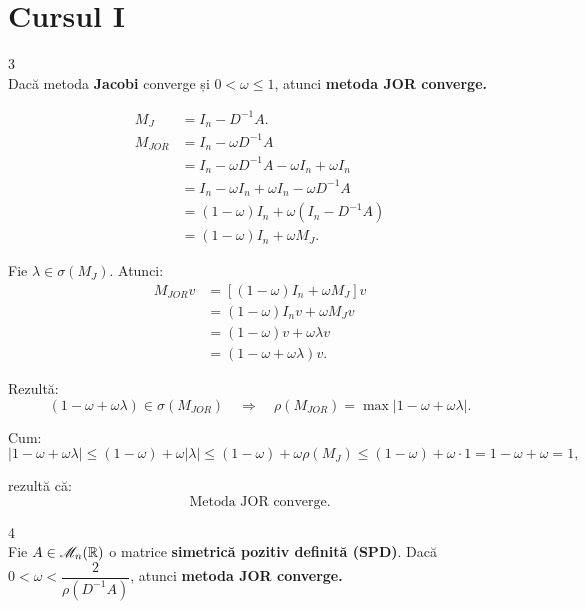 
\section*{Cursul I}

\begin{teorema}{3}
    \text{ }\\[0.5em]
    Dacă metoda \textbf{Jacobi} converge și $0 < \omega \le 1$, atunci \textbf{metoda JOR converge.}
\end{teorema}

\begin{demonstratie}
    \begin{align*}
        M_J &= I_n - D^{-1}A. \\[0.8em]
        M_{JOR} &= I_n - \omega D^{-1}A \\[0.5em]
        &= I_n - \omega D^{-1}A - \omega I_n + \omega I_n \\[0.5em]
        &= I_n - \omega I_n + \omega I_n - \omega D^{-1}A \\[0.5em]
        &= (1 - \omega) I_n + \omega (I_n - D^{-1}A) \\[0.5em]
        &= (1 - \omega) I_n + \omega M_J.
    \end{align*}

    Fie \(\lambda \in \sigma(M_J)\). Atunci:
    \begin{align*}
        M_{JOR} v &= [(1 - \omega)I_n + \omega M_J] v \\[0.5em]
        &= (1 - \omega) I_n v + \omega M_J v \\[0.5em]
        &= (1 - \omega) v + \omega \lambda v \\[0.5em]
        &= (1 - \omega + \omega \lambda) v.
    \end{align*}

    Rezultă:
    $$
    (1 - \omega + \omega \lambda) \in \sigma(M_{JOR}) \quad \Rightarrow \quad \rho(M_{JOR}) = \max |1 - \omega + \omega \lambda|.
    $$

    Cum:
    $$
    |1 - \omega + \omega \lambda| \le (1 - \omega) + \omega |\lambda| \le (1 - \omega) + \omega \rho(M_J) \le (1 - \omega) + \omega \cdot 1 = 1 - \omega + \omega = 1,
    $$

    rezultă că:
    $$
    \boxed{\text{Metoda JOR converge.}}
    $$
\end{demonstratie}

\begin{teorema}{4}
    \text{ }\\[0.5em]
    Fie $A \in \mathscr{M}_n(\mathbb{R})$ o matrice \textbf{simetrică pozitiv definită (SPD)}. Dacă $0 < \omega < \dfrac{2}{\rho(D^{-1}A)}$, atunci \textbf{metoda JOR converge.}
\end{teorema}

